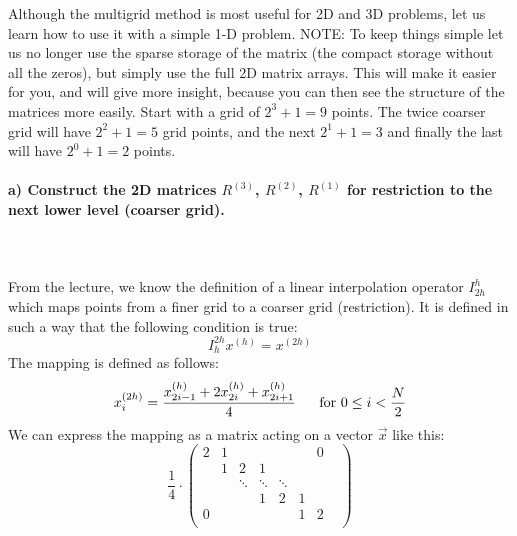 Although the multigrid method is most useful for 2D and 3D problems,
let us learn how to use it with a simple 1-D problem.
NOTE: To keep things simple let us no longer use the sparse storage of
the matrix (the compact storage without all the zeros), but simply use
the full 2D matrix arrays. This will make it easier for you, and will
give more insight, because you can then see the structure of the
matrices more easily.
Start with a grid of $2^3+1=9$ points. The twice coarser grid will have
$2^2+1=5$ grid points, and the next $2^1+1=3$ and finally the last will
have $2^0+1=2$ points.

\paragraph{
    a) Construct the 2D matrices $R^{(3)}$, $R^{(2)}$, $R^{(1)}$
    for restriction to the next lower level (coarser grid).
} \ \\
    \\
    From the lecture, we know the definition of a linear
    interpolation operator $I_{2h}^h$ which maps points from
    a finer grid to a coarser grid (restriction).  It is
    defined in such a way that the following condition is true:
    \begin{equation}
        I_h^{2h}x^{(h)}=x^{(2h)}
    \end{equation}
    The mapping is defined as follows:
    \begin{equation}
        x_i^{(2h)}=
        \frac{x_{2i-1}^{(h)}+2x_{2i}^{(h)}+x_{2i+1}^{(h)}}{4}
        \ \ \ \ \
        \textnormal{for }0\leq i<\frac{N}{2}
    \end{equation}
    We can express the mapping as a matrix acting on a vector
    $\vec x$ like this:
    \begin{equation}
        \frac{1}{4}\cdot
        \begin{pmatrix}
            2      & 1 &    &   &        &        & 0 & \\
                   & 1 & 2  & 1 &        &        &        & \\
                   &   & \ddots & \ddots & \ddots &        & \\
                   &   &        & 1      & 2      & 1      & \\
            0 &   &        &        &        & 1      & 2 \\
        \end{pmatrix}
    \end{equation}

